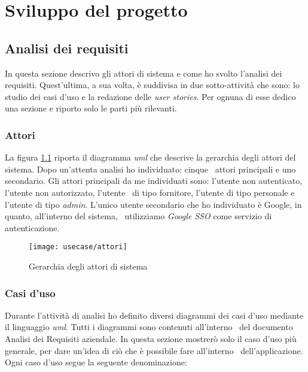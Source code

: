 
\chapter{Sviluppo del progetto}
\label{cap:sviluppo}
\section{Analisi dei requisiti}
In questa sezione descrivo gli attori di sistema e come ho svolto l'analisi dei requisiti.
Quest'ultima, a sua volta, è suddivisa in due sotto-attività che sono: lo studio dei casi d'uso e la redazione delle \emph{user stories}.
Per ognuna di esse dedico una sezione e riporto solo le parti più rilevanti.

\subsection{Attori}
La figura \ref{fig:attori} riporta il diagramma \emph{\acrshort{uml}} che descrive la gerarchia degli attori del sistema. Dopo un'attenta analisi ho individuato: cinque \
attori principali e uno secondario. Gli attori principali da me individuati sono: l'utente non autenticato, l'utente non autorizzato, l'utente \
di tipo fornitore, l'utente di tipo personale e l'utente di tipo \emph{admin}. L'unico utente secondario che ho individuato è Google, in quanto, all'interno del sistema, \
utilizziamo \emph{Google SSO} come servizio di autenticazione. 

\begin{figure}[!ht]
  \begin{center}
    \texttt{[image: usecase/attori]}
    \caption{Gerarchia degli attori di sistema}
    \label{fig:attori}
  \end{center}
\end{figure}

\subsection{Casi d'uso}
Durante l'attività di analisi ho definito diversi diagrammi dei casi d'uso mediante il linguaggio \emph{\acrshort{uml}}. Tutti i diagrammi sono contenuti all'interno \
del documento Analisi dei Requisiti aziendale. In questa sezione mostrerò solo il caso d'uso più generale, per dare un'idea di ciò che è possibile fare all'interno \
dell'applicazione. Ogni caso d'uso segue la seguente denominazione:

